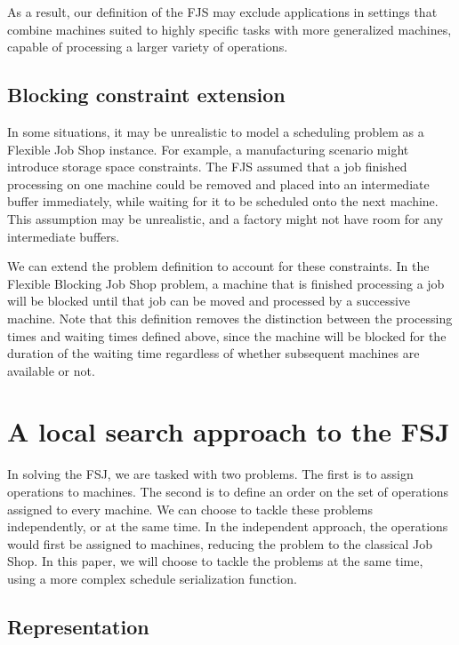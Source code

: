 \documentclass[a4paper,12pt]{article}
\begin{document}
As a result, our definition of the FJS may exclude applications in settings that combine machines suited to highly specific tasks with more generalized machines, capable of processing a larger variety of operations.

\subsection{Blocking constraint extension}

In some situations, it may be unrealistic to model a scheduling problem as a Flexible Job Shop instance. For example, a manufacturing scenario might introduce storage space constraints. The FJS assumed that a job finished processing on one machine could be removed and placed into an intermediate buffer immediately, while waiting for it to be scheduled onto the next machine. This assumption may be unrealistic, and a factory might not have room for any intermediate buffers.

We can extend the problem definition to account for these constraints. In the Flexible Blocking Job Shop problem, a machine that is finished processing a job will be blocked until that job can be moved and processed by a successive machine. Note that this definition removes the distinction between the processing times and waiting times defined above, since the machine will be blocked for the duration of the waiting time regardless of whether subsequent machines are available or not.

\section{A local search approach to the FSJ}

In solving the FSJ, we are tasked with two problems. The first is to assign operations to machines. The second is to define an order on the set of operations assigned to every machine. We can choose to tackle these problems independently, or at the same time. In the independent approach, the operations would first be assigned to machines, reducing the problem to the classical Job Shop. In this paper, we will choose to tackle the problems at the same time, using a more complex schedule serialization function.

\subsection{Representation}
\end{document}
